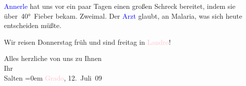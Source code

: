 \pstart
           \textcolor{blue}{Annerle}{}\ledrightnote{\textcolor{blue}{Anna Katharina Rehmann}} hat uns vor ein paar Tagen einen
               großen Schreck bereitet, indem sie über 40° Fieber bekam. Zweimal. Der \textcolor{blue}{Arzt}{}\ledrightnote{{$\rightarrow$}\textcolor{blue}{?? [Mediziner in Grado]}} glaubt, an Malaria, was
               sich heute entscheiden müßte.\pend
           
\pstart
           Wir reisen Donnerstag{ }früh und sind freitag in \textcolor{pink}{Landro}{}\ledrightnote{\textcolor{pink}{Höhlenstein}}!\pend
           
\pstart
           Alles herzliche von uns zu Ihnen {\\[\baselineskip]}Ihr {\\[\baselineskip]}\spacefill\mbox{Salten}\pend
           \leftskip=0em{}
\pstart
           \textcolor{pink}{Grado}{}\ledrightnote{\textcolor{pink}{Grado}}, 12. Juli 09\pend
           \endnumbering{}  
      